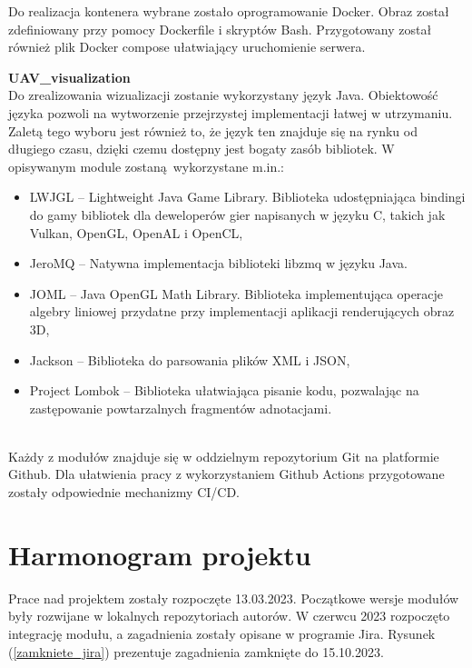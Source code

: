 \documentclass[15pt]{sprawozdanie}
\begin{document}
Do realizacja kontenera wybrane zostało oprogramowanie Docker. Obraz został zdefiniowany przy pomocy Dockerfile i skryptów Bash. Przygotowany został również plik Docker compose ułatwiający uruchomienie serwera.

\newpage

\textbf{UAV\_visualization}\\

Do zrealizowania wizualizacji zostanie wykorzystany język Java. Obiektowość języka pozwoli na wytworzenie przejrzystej implementacji łatwej w utrzymaniu. Zaletą tego wyboru jest również to, że język ten znajduje się na rynku od długiego czasu, dzięki czemu dostępny jest bogaty zasób bibliotek. W opisywanym module zostaną wykorzystane m.in.:
\begin{itemize}[noitemsep,nolistsep]
	\item LWJGL -- Lightweight Java Game Library. Biblioteka udostępniająca bindingi do gamy bibliotek dla deweloperów gier napisanych w języku C, takich jak Vulkan, OpenGL, OpenAL i OpenCL,
	\item JeroMQ -- Natywna implementacja biblioteki libzmq w języku Java.
	\item JOML -- Java OpenGL Math Library. Biblioteka implementująca operacje algebry liniowej przydatne przy implementacji aplikacji renderujących obraz 3D,
	\item Jackson -- Biblioteka do parsowania plików XML i JSON,
	\item Project Lombok -- Biblioteka ułatwiająca pisanie kodu, pozwalając na zastępowanie powtarzalnych fragmentów adnotacjami.
\end{itemize}
\ \\ 
Każdy z modułów znajduje się w oddzielnym repozytorium Git na platformie Github. Dla ułatwienia pracy z wykorzystaniem Github Actions przygotowane zostały odpowiednie mechanizmy CI/CD.



\newpage
\section{Harmonogram projektu}

Prace nad projektem zostały rozpoczęte 13.03.2023. Początkowe wersje modułów były rozwijane w lokalnych repozytoriach autorów. W czerwcu 2023 rozpoczęto integrację modułu, a zagadnienia zostały opisane w programie Jira. Rysunek (\ref{zamkniete_jira}) prezentuje zagadnienia zamknięte do 15.10.2023.
\end{document}
